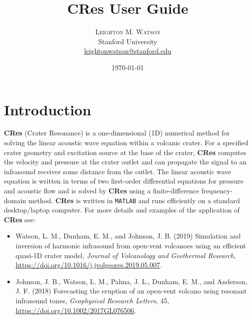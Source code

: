\documentclass[10pt]{article}
\title{CRes User Guide} %
\author{%
\textsc{Leighton M. Watson} \\%
\normalsize Stanford University \\ %
\normalsize \href{mailto:leightonwatson@stanford.edu}{leightonwatson@stanford.edu} %
}
\date{\today} %
\begin{document}
\maketitle


\section{Introduction}
{\bf CRes} (Crater Resonance) is a one-dimensional (1D) numerical method for solving the linear acoustic wave equation within a volcanic crater. For a specified crater geometry and excitation source at the base of the crater, {\bf CRes} computes the velocity and pressure at the crater outlet and can propagate the signal to an infrasound receiver some distance from the outlet. The linear acoustic wave equation is written in terms of two first-order differential equations for pressure and acoustic flow and is solved by {\bf CRes} using a finite-difference frequency-domain method. {\bf CRes} is written in \texttt{MATLAB} and runs efficiently on a standard desktop/laptop computer. For more details and examples of the application of {\bf CRes} see:
\begin{itemize}
\item Watson, L. M., Dunham, E. M., and Johnson, J. B. (2019) Simulation and inversion of harmonic infrasound from open-vent volcanoes using an efficient quasi-1D crater model, \emph{Journal of Volcanology and Geothermal Research}, \href{https://doi.org/10.1016/j.jvolgeores.2019.05.007}{https://doi.org/10.1016/j.jvolgeores.2019.05.007}.
\item Johnson, J. B., Watson, L. M., Palma, J. L., Dunham, E. M., and Anderson, J. F. (2018) Forecasting the eruption of an open-vent volcano using resonant infrasound tones, \emph{Geophysical Research Letters}, 45, \href{https://doi.org/10.1002/2017GL076506}{https://doi.org/10.1002/2017GL076506}.
\end{itemize}
\end{document}
